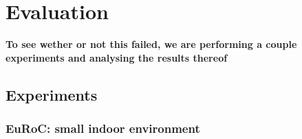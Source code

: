 \documentclass[main.tex]{subfiles}
\begin{document}
\chapter{Evaluation}

\textbf{To see wether or not this failed, we are performing a couple experiments and analysing the results thereof }

\section{Experiments}
\subsection{EuRoC: small indoor environment}
\end{document}
